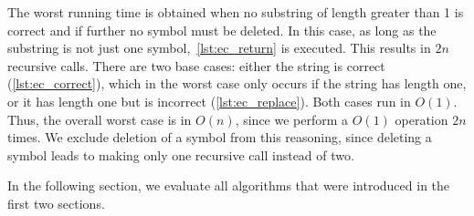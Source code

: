 The worst running time is obtained when no substring of length greater than 1 is correct and if further no symbol must be deleted.
In this case, as long as the substring is not just one symbol,~\cref{lst:ec_return} is executed.
This results in $2n$ recursive calls.
There are two base cases: either the string is correct (\cref{lst:ec_correct}), which in the worst case only occurs if the string has length one, or it has length one but is incorrect (\cref{lst:ec_replace}).
Both cases run in $O(1)$.
Thus, the overall worst case is in $O(n)$, since we perform a $O(1)$ operation $2n$ times.
We exclude deletion of a symbol from this reasoning, since deleting a symbol leads to making only one recursive call instead of two.

In the following section, we evaluate all algorithms that were introduced in the first two sections.
